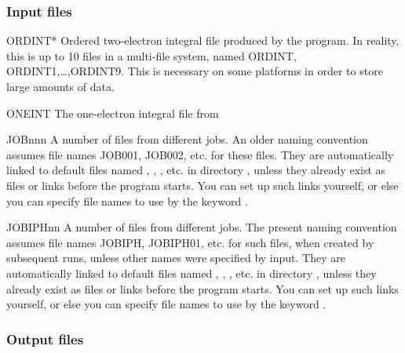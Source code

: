 \subsubsection{Input files}
\begin{filelist}
\item[ORDINT*]
Ordered two-{}electron integral file produced by the 
program. In reality, this is up to 10 files in a multi-file system,
named ORDINT, ORDINT1,\dots,ORDINT9. This is necessary on some platforms
in order to store large amounts of data.
\item[ONEINT]
The one-{}electron integral file from 
\item[JOBnnn]
A number of  files from different  jobs.
An older naming convention assumes file names JOB001, JOB002, etc. for these files.
They are automatically linked to default files named ,
, , etc.  in directory ,
unless they already exist as files or links before the program starts.
You can set up such links yourself, or else you can specify file names
to use by the keyword .
\item[JOBIPHnn]
A number of  files from different  jobs.
The present naming convention assumes file names JOBIPH, JOBIPH01, etc. for
such files, when created by subsequent  runs, unless
other names were specified by input.
They are automatically linked to default files named ,
, , etc.  in directory ,
unless they already exist as files or links before the program starts.
You can set up such links yourself, or else you can specify file names
to use by the keyword .

\end{filelist}

\subsubsection{Output files}

